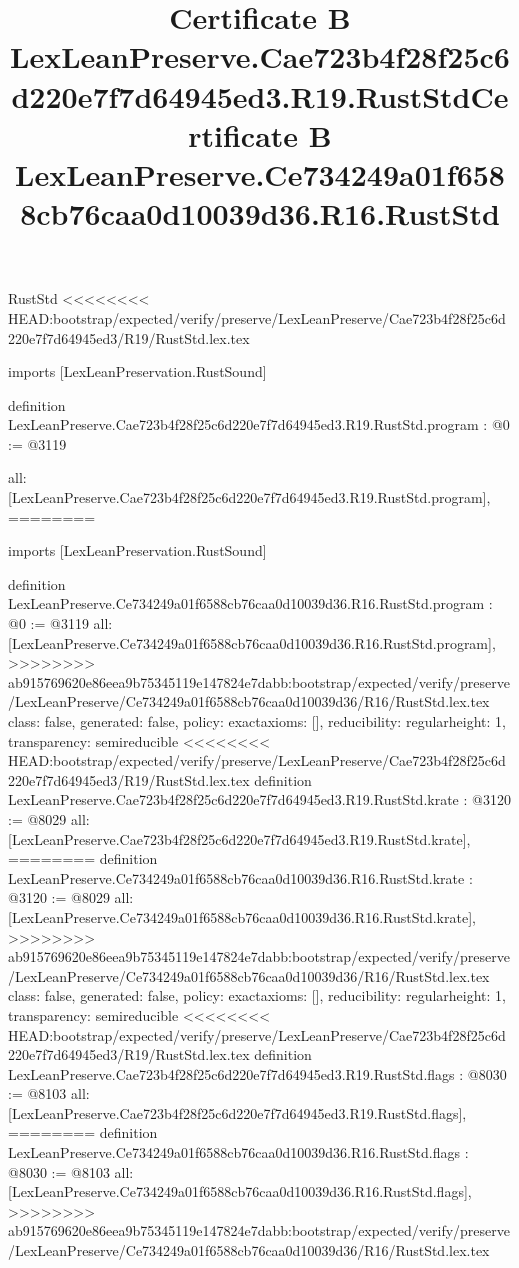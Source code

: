 \begin{lexlean}{RustStd}
<<<<<<<< HEAD:bootstrap/expected/verify/preserve/LexLeanPreserve/Cae723b4f28f25c6d220e7f7d64945ed3/R19/RustStd.lex.tex
\title{Certificate B LexLeanPreserve.Cae723b4f28f25c6d220e7f7d64945ed3.R19.RustStd}
\begin{coremodule}
imports [LexLeanPreservation.RustSound]

definition LexLeanPreserve.Cae723b4f28f25c6d220e7f7d64945ed3.R19.RustStd.program : @0 := @3119 {
  all: [LexLeanPreserve.Cae723b4f28f25c6d220e7f7d64945ed3.R19.RustStd.program],
========
\title{Certificate B LexLeanPreserve.Ce734249a01f6588cb76caa0d10039d36.R16.RustStd}
\begin{coremodule}
imports [LexLeanPreservation.RustSound]

definition LexLeanPreserve.Ce734249a01f6588cb76caa0d10039d36.R16.RustStd.program : @0 := @3119 {
  all: [LexLeanPreserve.Ce734249a01f6588cb76caa0d10039d36.R16.RustStd.program],
>>>>>>>> ab915769620e86eea9b75345119e147824e7dabb:bootstrap/expected/verify/preserve/LexLeanPreserve/Ce734249a01f6588cb76caa0d10039d36/R16/RustStd.lex.tex
  class: false,
  generated: false,
  policy: exact{axioms: []},
  reducibility: regular{height: 1},
  transparency: semireducible
}
<<<<<<<< HEAD:bootstrap/expected/verify/preserve/LexLeanPreserve/Cae723b4f28f25c6d220e7f7d64945ed3/R19/RustStd.lex.tex
definition LexLeanPreserve.Cae723b4f28f25c6d220e7f7d64945ed3.R19.RustStd.krate : @3120 := @8029 {
  all: [LexLeanPreserve.Cae723b4f28f25c6d220e7f7d64945ed3.R19.RustStd.krate],
========
definition LexLeanPreserve.Ce734249a01f6588cb76caa0d10039d36.R16.RustStd.krate : @3120 := @8029 {
  all: [LexLeanPreserve.Ce734249a01f6588cb76caa0d10039d36.R16.RustStd.krate],
>>>>>>>> ab915769620e86eea9b75345119e147824e7dabb:bootstrap/expected/verify/preserve/LexLeanPreserve/Ce734249a01f6588cb76caa0d10039d36/R16/RustStd.lex.tex
  class: false,
  generated: false,
  policy: exact{axioms: []},
  reducibility: regular{height: 1},
  transparency: semireducible
}
<<<<<<<< HEAD:bootstrap/expected/verify/preserve/LexLeanPreserve/Cae723b4f28f25c6d220e7f7d64945ed3/R19/RustStd.lex.tex
definition LexLeanPreserve.Cae723b4f28f25c6d220e7f7d64945ed3.R19.RustStd.flags : @8030 := @8103 {
  all: [LexLeanPreserve.Cae723b4f28f25c6d220e7f7d64945ed3.R19.RustStd.flags],
========
definition LexLeanPreserve.Ce734249a01f6588cb76caa0d10039d36.R16.RustStd.flags : @8030 := @8103 {
  all: [LexLeanPreserve.Ce734249a01f6588cb76caa0d10039d36.R16.RustStd.flags],
>>>>>>>> ab915769620e86eea9b75345119e147824e7dabb:bootstrap/expected/verify/preserve/LexLeanPreserve/Ce734249a01f6588cb76caa0d10039d36/R16/RustStd.lex.tex
}}}
\end{coremodule}}
\end{coremodule}
\end{lexlean}

